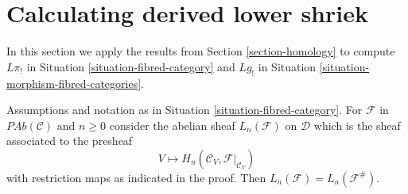 \section{Calculating derived lower shriek}
\label{section-calculate}

\noindent
In this section we apply the results from
Section \ref{section-homology}
to compute
$L\pi_!$ in Situation \ref{situation-fibred-category} and
$Lg_!$ in Situation \ref{situation-morphism-fibred-categories}.

\begin{lemma}
\label{lemma-compute-left-derived-pi-shriek-pre}
Assumptions and notation as in Situation \ref{situation-fibred-category}.
For $\mathcal{F}$ in $\textit{PAb}(\mathcal{C})$ and $n \geq 0$
consider the abelian sheaf $L_n(\mathcal{F})$ on $\mathcal{D}$
which is the sheaf associated to the presheaf
$$
V \longmapsto H_n(\mathcal{C}_V, \mathcal{F}|_{\mathcal{C}_V})
$$
with restriction maps as indicated in the proof. Then
$L_n(\mathcal{F}) = L_n(\mathcal{F}^\#)$.
\end{lemma}


